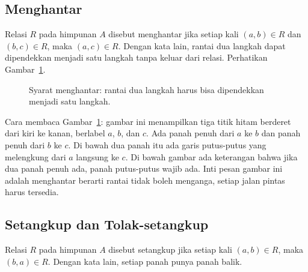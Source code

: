 \documentclass[11pt,a4paper]{article}
\begin{document}
\subsection{Menghantar}

Relasi $R$ pada himpunan $A$ disebut menghantar jika setiap kali $(a,b) \in R$ dan $(b,c) \in R$, maka $(a,c) \in R$. Dengan kata lain, rantai dua langkah dapat dipendekkan menjadi satu langkah tanpa keluar dari relasi. Perhatikan Gambar~\ref{fig:menghantar}.

\begin{figure}[H]
	\centering
	\caption{Syarat menghantar: rantai dua langkah harus bisa dipendekkan menjadi satu langkah.}
	\label{fig:menghantar}
\end{figure}

Cara membaca Gambar~\ref{fig:menghantar}: gambar ini menampilkan tiga titik hitam berderet dari kiri ke kanan, berlabel $a$, $b$, dan $c$. Ada panah penuh dari $a$ ke $b$ dan panah penuh dari $b$ ke $c$. Di bawah dua panah itu ada garis putus-putus yang melengkung dari $a$ langsung ke $c$. Di bawah gambar ada keterangan bahwa jika dua panah penuh ada, panah putus-putus wajib ada. Inti pesan gambar ini adalah menghantar berarti rantai tidak boleh menganga, setiap jalan pintas harus tersedia.

\subsection{Setangkup dan Tolak-setangkup}

Relasi $R$ pada himpunan $A$ disebut setangkup jika setiap kali $(a,b) \in R$, maka $(b,a) \in R$. Dengan kata lain, setiap panah punya panah balik.
\end{document}
